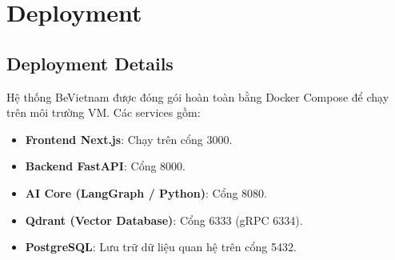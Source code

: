 \section{Deployment}

\subsection{Deployment Details}

Hệ thống BeVietnam được đóng gói hoàn toàn bằng Docker Compose để chạy trên môi trường VM. Các services gồm:
\begin{itemize}
    \item \textbf{Frontend Next.js}: Chạy trên cổng 3000.
    \item \textbf{Backend FastAPI}: Cổng 8000.
    \item \textbf{AI Core (LangGraph / Python)}: Cổng 8080.
    \item \textbf{Qdrant (Vector Database)}: Cổng 6333 (gRPC 6334).
    \item \textbf{PostgreSQL}: Lưu trữ dữ liệu quan hệ trên cổng 5432.
\end{itemize}
